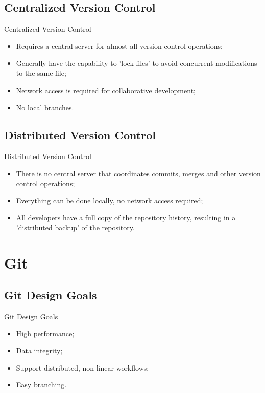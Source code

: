 \documentclass{beamer}
\begin{document}
\subsection{Centralized Version Control}
\begin{frame}{Centralized Version Control}
  \begin{itemize}
    \item Requires a central server for almost all version control operations;
    \item Generally have the capability to 'lock files' to avoid concurrent modifications to the same file;
    \item Network access is required for collaborative development;
    \item No local branches.
  \end{itemize}
\end{frame}

\subsection{Distributed Version Control}
\begin{frame}{Distributed Version Control}
  \begin{itemize}
    \item There is no central server that coordinates commits, merges and other version control operations;
    \item Everything can be done locally, no network access required;
    \item All developers have a full copy of the repository history, resulting in a 'distributed backup' of the repository.
  \end{itemize}
\end{frame}

\section{Git}

\subsection{Git Design Goals}
\begin{frame}{Git Design Goals}
  \begin{itemize}
    \item High performance; 
    \item Data integrity;
    \item Support distributed, non-linear workflows;
    \item Easy branching.
  \end{itemize}
\end{frame}
\end{document}
